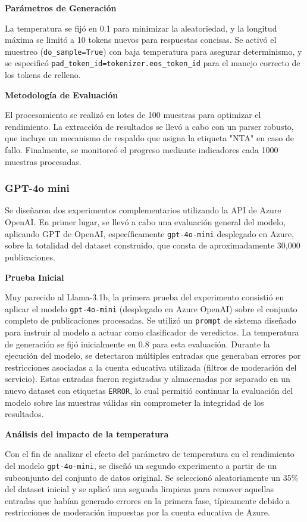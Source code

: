 \textbf{Parámetros de Generación} 

La temperatura se fijó en 0.1 para minimizar la aleatoriedad, y la longitud máxima se limitó a 10 tokens nuevos para respuestas concisas. Se activó el muestreo (\texttt{do\_sample=True}) con baja temperatura para asegurar determinismo, y se especificó \texttt{pad\_token\_id=tokenizer.eos\_token\_id} para el manejo correcto de los tokens de relleno.

\textbf{Metodología de Evaluación} 

El procesamiento se realizó en lotes de 100 muestras para optimizar el rendimiento. La extracción de resultados se llevó a cabo con un parser robusto, que incluye un mecanismo de respaldo que asigna la etiqueta "NTA" en caso de fallo. Finalmente, se monitoreó el progreso mediante indicadores cada 1000 muestras procesadas.


\subsubsection{GPT-4o mini}

Se diseñaron dos experimentos complementarios utilizando la API de Azure OpenAI. En primer lugar, se llevó a cabo una evaluación general del modelo, aplicando GPT de OpenAI, específicamente \texttt{gpt-4o-mini} desplegado en Azure, sobre la totalidad del dataset construido, que consta de aproximadamente 30,000 publicaciones. 

\textbf{Prueba Inicial}

Muy parecido al Llama-3.1b, la primera prueba del experimento consistió en aplicar el modelo \texttt{gpt-4o-mini} (desplegado en Azure OpenAI) sobre el conjunto completo de publicaciones procesadas. Se utilizó un \texttt{prompt} de sistema diseñado para instruir al modelo a actuar como clasificador de veredictos. La temperatura de generación se fijó inicialmente en 0.8 para esta evaluación. Durante la ejecución del modelo, se detectaron múltiples entradas que generaban errores por restricciones asociadas a la cuenta educativa utilizada (filtros de moderación del servicio). Estas entradas fueron registradas y almacenadas por separado en un nuevo dataset con etiquetas \texttt{ERROR}, lo cual permitió continuar la evaluación del modelo sobre las muestras válidas sin comprometer la integridad de los resultados.

\textbf{Análisis del impacto de la temperatura}

Con el fin de analizar el efecto del parámetro de temperatura en el rendimiento del modelo \texttt{gpt-4o-mini}, se diseñó un segundo experimento a partir de un subconjunto del conjunto de datos original. Se seleccionó aleatoriamente un 35\% del dataset inicial y se aplicó una segunda limpieza para remover aquellas entradas que habían generado errores en la primera fase, típicamente debido a restricciones de moderación impuestas por la cuenta educativa de Azure.

